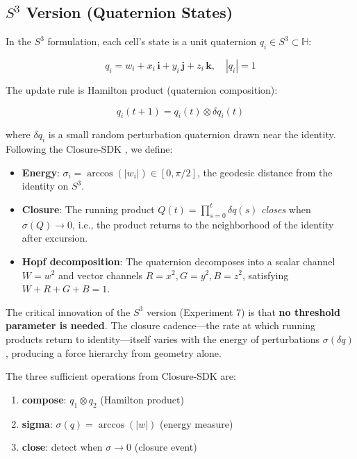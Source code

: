 \documentclass[letterpaper,12pt]{article}
\begin{document}
\subsection{$S^3$ Version (Quaternion States)}

In the $S^3$ formulation, each cell's state is a unit quaternion $q_i \in S^3 \subset \mathbb{H}$:

\begin{equation}
q_i = w_i + x_i\,\mathbf{i} + y_i\,\mathbf{j} + z_i\,\mathbf{k}, \quad |q_i| = 1
\end{equation}

The update rule is Hamilton product (quaternion composition):

\begin{equation}
q_i(t+1) = q_i(t) \otimes \delta q_i(t)
\end{equation}

where $\delta q_i$ is a small random perturbation quaternion drawn near the identity. Following the Closure-SDK \cite{daSilva2025}, we define:

\begin{itemize}
  \item \textbf{Energy}: $\sigma_i = \arccos(|w_i|) \in [0, \pi/2]$, the geodesic distance from the identity on $S^3$.
  \item \textbf{Closure}: The running product $Q(t) = \prod_{s=0}^{t} \delta q(s)$ \emph{closes} when $\sigma(Q) \to 0$, i.e., the product returns to the neighborhood of the identity after excursion.
  \item \textbf{Hopf decomposition}: The quaternion decomposes into a scalar channel $W = w^2$ and vector channels $R = x^2, G = y^2, B = z^2$, satisfying $W + R + G + B = 1$.
\end{itemize}

The critical innovation of the $S^3$ version (Experiment 7) is that \textbf{no threshold parameter is needed}. The closure cadence---the rate at which running products return to identity---itself varies with the energy of perturbations $\sigma(\delta q)$, producing a force hierarchy from geometry alone.

The three sufficient operations from Closure-SDK are:

\begin{enumerate}
  \item \textbf{compose}: $q_1 \otimes q_2$ (Hamilton product)
  \item \textbf{sigma}: $\sigma(q) = \arccos(|w|)$ (energy measure)
  \item \textbf{close}: detect when $\sigma \to 0$ (closure event)
\end{enumerate}
\end{document}
